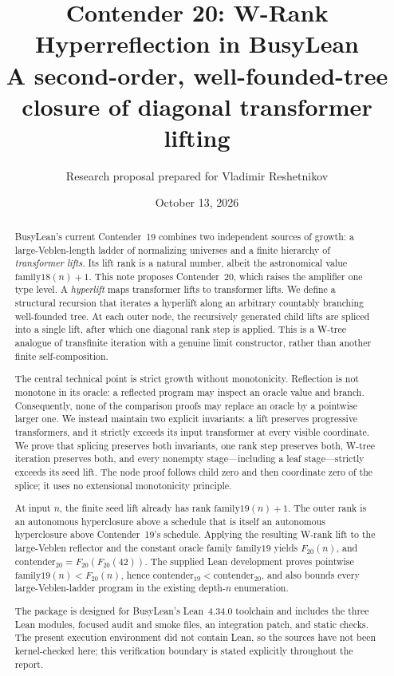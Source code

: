 \documentclass[11pt]{article}
\title{\textbf{Contender 20: W-Rank Hyperreflection in BusyLean}\\[0.45em]
  \large A second-order, well-founded-tree closure of diagonal transformer lifting}
\author{Research proposal prepared for Vladimir Reshetnikov}
\date{October 13, 2026}
\theoremstyle{definition}
\theoremstyle{remark}
\begin{document}
\maketitle

\begin{abstract}
BusyLean's current Contender~19 combines two independent sources of growth: a
large-Veblen-length ladder of normalizing universes and a finite hierarchy of
\emph{transformer lifts}.  Its lift rank is a natural number, albeit the
astronomical value \(\mathrm{family18}(n)+1\).  This note proposes Contender~20,
which raises the amplifier one type level.  A \emph{hyperlift} maps transformer
lifts to transformer lifts.  We define a structural recursion that iterates a
hyperlift along an arbitrary countably branching well-founded tree.  At each
outer node, the recursively generated child lifts are spliced into a single
lift, after which one diagonal rank step is applied.  This is a W-tree analogue
of transfinite iteration with a genuine limit constructor, rather than another
finite self-composition.

The central technical point is strict growth without monotonicity.  Reflection
is not monotone in its oracle: a reflected program may inspect an oracle value
and branch.  Consequently, none of the comparison proofs may replace an
oracle by a pointwise larger one.  We instead maintain two explicit invariants:
a lift preserves progressive transformers, and it strictly exceeds its input
transformer at every visible coordinate.  We prove that splicing preserves
both invariants, one rank step preserves both, W-tree iteration preserves both,
and every nonempty stage---including a leaf stage---strictly exceeds its seed
lift.  The node proof follows child zero and then coordinate zero of the splice;
it uses no extensional monotonicity principle.

At input \(n\), the finite seed lift already has rank
\(\mathrm{family19}(n)+1\).  The outer rank is an autonomous hyperclosure above
a schedule that is itself an autonomous hyperclosure above Contender~19's
schedule.  Applying the resulting W-rank lift to the large-Veblen reflector and
the constant oracle family \(\mathrm{family19}\) yields \(F_{20}(n)\), and
\(\mathrm{contender}_{20}=F_{20}(F_{20}(42))\).  The supplied Lean development
proves pointwise \(\mathrm{family19}(n)<F_{20}(n)\), hence
\(\mathrm{contender}_{19}<\mathrm{contender}_{20}\), and also bounds every
large-Veblen-ladder program in the existing depth-\(n\) enumeration.

The package is designed for BusyLean's Lean~4.34.0 toolchain and includes the
three Lean modules, focused audit and smoke files, an integration patch, and
static checks.  The present execution environment did not contain Lean, so the
sources have not been kernel-checked here; this verification boundary is stated
explicitly throughout the report.
\end{abstract}
\end{document}
